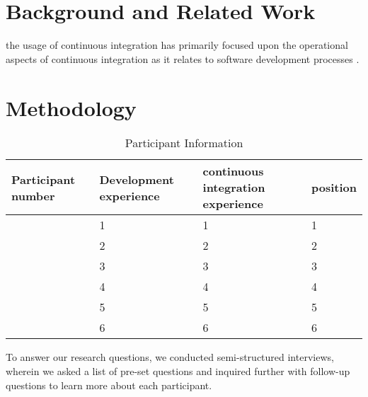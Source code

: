 \documentclass{sig-alternate}
\begin{document}

\section{Background and Related Work}

the usage of continuous integration has primarily focused upon the operational aspects of continuous integration as it relates to software development processes \cite{miller:hundreddays}\cite{olsson:climbingstairway}.

\section{Methodology}

\begin{table}[b]
	\centering
	\label{table:participant}
	\caption{Participant Information}
	\begin{tabular}{ | p{} | p{} | p{} | p{} | }\hline
		Participant number & Development experience & continuous integration experience & position \\ \hline
		\michael & 1 & 1 & 1 \\ \hline
		\sruti & 2 & 2 & 2 \\ \hline
		\caius & 3 & 3 & 3 \\ \hline
		\srutitwo & 4 & 4 & 4 \\ \hline
		\david & 5 & 5 & 5 \\ \hline
		\cpg & 6 & 6 & 6 \\ \hline
	\end{tabular}
\end{table}
To answer our research questions, we conducted semi-structured interviews, wherein we asked a list of pre-set questions and inquired further with follow-up questions to learn more about each participant. \\
\end{document}
